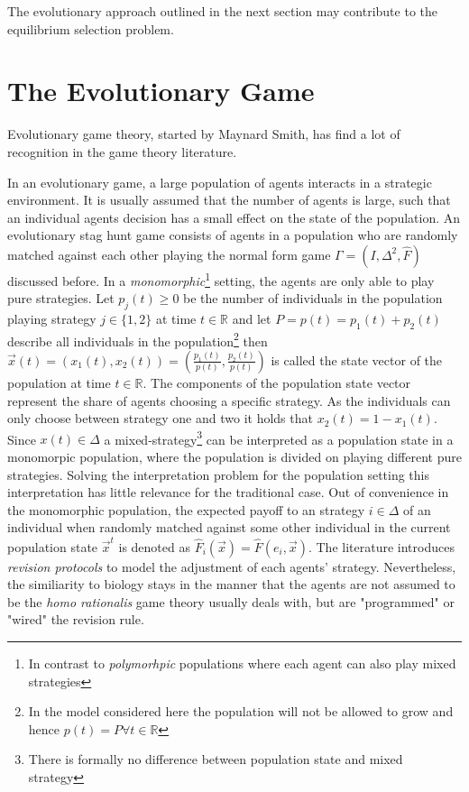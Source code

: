 \documentclass[11pt]{article}
\newcommand{\realnumb}{\mathbb{R}}
\begin{document}
The evolutionary approach outlined in the next section may contribute to 
the equilibrium selection problem. 

\section{The Evolutionary Game}
\label{evolutionarysection}
Evolutionary game theory, started by Maynard Smith, has find a lot of 
recognition in the game theory literature. 

In an evolutionary game, a large population of agents interacts in a 
strategic environment. It is usually assumed that the number of agents is 
large, such that an individual agents decision has a small effect on the
state of the population. 
An evolutionary stag hunt game consists of agents in a population who
are randomly matched against each other playing the normal form game 
$\Gamma = (I,\Delta^2,\hat{F})$ discussed before. In a \textit{monomorphic}\footnote{In 
contrast to \textit{polymorhpic} populations where each agent can also 
play mixed strategies} setting, the agents are only able to play pure 
strategies. Let $p_j(t) \geq 0$ be the number of individuals in the population
playing strategy $j \in \{1,2\}$ at time $t \in \realnumb$ and 
let $P = p(t) = p_1(t) + p_2(t)$ describe all individuals 
in the population\footnote{In the model considered here the population will 
not be allowed to grow and hence $p(t) = P \forall t \in \realnumb$}
then $\vec{x}(t) = \left(x_1(t),x_2(t)\right)
=\left(\frac{p_1(t)}{p(t)},\frac{p_2(t)}{p(t)}\right)$ 
is called the state vector of the population at
time $t \in \realnumb$. The components of the population state vector represent
the share of agents choosing a specific strategy. 
As the individuals can only choose between strategy one and two it holds that 
$x_2(t) = 1-x_1(t)$. Since $x(t) \in \Delta$ a 
mixed-strategy\footnote{There is formally no difference between population 
state and mixed strategy} can 
be interpreted as a population state in a monomorpic population, where the 
population is divided on playing different pure strategies. 
Solving the interpretation problem for the population setting this 
interpretation has little relevance for the traditional case. 
Out of convenience in the monomorphic population, the expected payoff 
to an strategy $i \in \Delta$ of an individual when randomly matched
against some other individual in the current population state $\vec{x}^t$ 
is denoted as $\hat{F}_i(\vec{x}) = \hat{F}(e_i,\vec{x})$.
The literature introduces \textit{revision protocols} to model the adjustment 
of each agents' strategy. Nevertheless, the similiarity to biology stays in 
the manner that the agents are not assumed to be the \textit{homo rationalis} 
game theory usually deals with, but are "programmed" or "wired" 
\parencite{gintis_game_2000} the revision rule.
\end{document}
